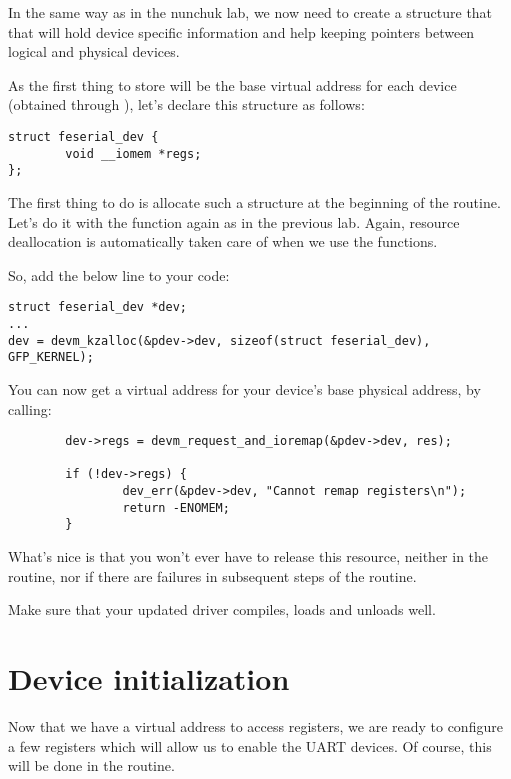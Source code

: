 In the same way as in the nunchuk lab, we now need to create a
structure that that will hold device specific information and help
keeping pointers between logical and physical devices.

As the first thing to store will be the base virtual address for
each device (obtained through ), let's declare this
structure as follows:

\begin{verbatim}
struct feserial_dev {
        void __iomem *regs;
};
\end{verbatim}

The first thing to do is allocate such a structure at the beginning
of the  routine. Let's do it with the 
function again as in the previous lab. Again, resource deallocation is
automatically taken care of when we use the  functions.

So, add the below line to your code:

\begin{verbatim}
struct feserial_dev *dev;
...
dev = devm_kzalloc(&pdev->dev, sizeof(struct feserial_dev), GFP_KERNEL);
\end{verbatim}

You can now get a virtual address for your device's base physical
address, by calling:

\begin{verbatim}
        dev->regs = devm_request_and_ioremap(&pdev->dev, res);

        if (!dev->regs) {
                dev_err(&pdev->dev, "Cannot remap registers\n");
                return -ENOMEM;
        }
\end{verbatim}

What's nice is that you won't ever have to release this resource,
neither in the  routine, nor if there are failures
in subsequent steps of the  routine.

Make sure that your updated driver compiles, loads and unloads well.

\section{Device initialization}

Now that we have a virtual address to access registers, we are ready to
configure a few registers which will allow us to enable the UART
devices. Of course, this will be done in the  routine.

